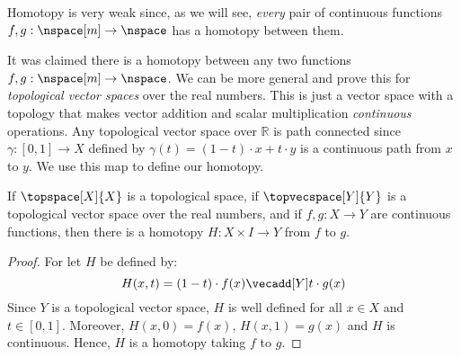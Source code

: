 \documentclass{book}                                                           %
\begin{document}
                Homotopy is very weak since, as we will see, \textit{every} pair
                of continuous functions $f,g:\nspace[m]\rightarrow\nspace$ has a
                homotopy between them.
                \par\hfill\par
                It was claimed there is a homotopy between any two functions
                $f,g:\nspace[m]\rightarrow\nspace$. We can be more general and
                prove this for \textit{topological vector spaces} over the real
                numbers. This is just a vector space with a topology that makes
                vector addition and scalar multiplication \textit{continuous}
                operations. Any topological vector space over $\mathbb{R}$ is
                path connected since $\gamma:[0,1]\rightarrow{X}$ defined by
                $\gamma(t)=(1-t)\cdot{x}+t\cdot{y}$ is a continuous path from
                $x$ to $y$. We use this map to define our homotopy.
                \begin{theorem}
                    If $\topspace[X]{X}$ is a topological space, if
                    $\topvecspace[Y]{Y}$ is a topological vector space over the
                    real numbers, and if $f,g:X\rightarrow{Y}$ are continuous
                    functions, then there is a homotopy
                    $H:X\times{I}\rightarrow{Y}$ from $f$ to $g$.
                \end{theorem}
                \begin{proof}
                    For let $H$ be defined by:
                    \begin{equation}
                        \label{eqn:Straight_Line_Homotopy}%
                        H(x,t)=(1-t)\cdot{f}(x)\vecadd[Y]t\cdot{g}(x)
                    \end{equation}
                    Since $Y$ is a topological vector space, $H$ is well defined
                    for all $x\in{X}$ and $t\in[0,1]$. Moreover, $H(x,0)=f(x)$,
                    $H(x,1)=g(x)$ and $H$ is continuous. Hence, $H$ is a
                    homotopy taking $f$ to $g$.
                \end{proof}
\end{document}
